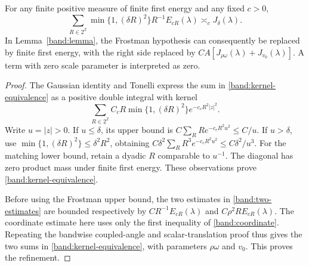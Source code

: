 \begin{lemma}\label{band:spatial}
For any finite positive measure of finite first energy and any fixed
\(c>0\),
\begin{equation}\label{band:kernel-equivalence}
\sum_{R\in2^{\mathbb Z}}
\min\{1,(\delta R)^2\}R^{-1}E_{cR}(\lambda)
\asymp_c J_\delta(\lambda).
\end{equation}
In Lemma~\ref{band:lemma}, the Frostman hypothesis can consequently be
replaced by finite first energy, with the right side replaced by
\(CA[J_{\rho\omega}(\lambda)+J_{v_0}(\lambda)]\). A term with zero
scale parameter is interpreted as zero.
\end{lemma}
\begin{proof}
The Gaussian identity and Tonelli express the sum in
\eqref{band:kernel-equivalence} as a positive double integral with kernel
$$
\sum_{R\in2^{\mathbb Z}} C_cR
                  \min\{1,(\delta R)^2\}e^{-c_cR^2|z|^2}.
$$
Write \(u=|z|>0\). If \(u\leq\delta\), its upper bound is
\(C\sum_R Re^{-c_cR^2u^2}\leq C/u\). If \(u>\delta\), use
\(\min\{1,(\delta R)^2\}\leq\delta^2R^2\), obtaining
\(C\delta^2\sum_R R^3e^{-c_cR^2u^2}\leq C\delta^2/u^3\).
For the matching lower bound, retain a dyadic \(R\) comparable to
\(u^{-1}\). The diagonal has zero product mass under finite first
energy. These observations prove \eqref{band:kernel-equivalence}.

Before using the Frostman upper bound, the two estimates in
\eqref{band:two-estimates} are bounded respectively by
\(CR^{-1}E_{cR}(\lambda)\) and
\(C\rho^2R E_{cR}(\lambda)\). The coordinate estimate here uses only
the first inequality of \eqref{band:coordinate}. Repeating the
bandwise coupled-angle and scalar-translation proof thus gives the
two sums in \eqref{band:kernel-equivalence}, with parameters
\(\rho\omega\) and \(v_0\). This proves the refinement.
\end{proof}

